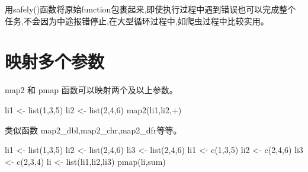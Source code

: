 \documentclass[
]{book}
\newenvironment{Shaded}{\begin{snugshade}}{\end{snugshade}}
\newcommand{\AttributeTok}[1]{\textcolor[rgb]{0.77,0.63,0.00}{#1}}
\newcommand{\DecValTok}[1]{\textcolor[rgb]{0.00,0.00,0.81}{#1}}
\newcommand{\FunctionTok}[1]{\textcolor[rgb]{0.00,0.00,0.00}{#1}}
\newcommand{\NormalTok}[1]{#1}
\newcommand{\OtherTok}[1]{\textcolor[rgb]{0.56,0.35,0.01}{#1}}
\newcommand{\StringTok}[1]{\textcolor[rgb]{0.31,0.60,0.02}{#1}}
\begin{document}
用safely()函数将原始function包裹起来,即使执行过程中遇到错误也可以完成整个任务,不会因为中途报错停止,在大型循环过程中,如爬虫过程中比较实用。

\hypertarget{ux6620ux5c04ux591aux4e2aux53c2ux6570}{%
\section{映射多个参数}\label{ux6620ux5c04ux591aux4e2aux53c2ux6570}}

map2 和 pmap 函数可以映射两个及以上参数。

\begin{Shaded}
\begin{Highlighting}[]
\NormalTok{li1 }\OtherTok{\textless{}{-}} \FunctionTok{list}\NormalTok{(}\DecValTok{1}\NormalTok{,}\DecValTok{3}\NormalTok{,}\DecValTok{5}\NormalTok{)}
\NormalTok{li2 }\OtherTok{\textless{}{-}} \FunctionTok{list}\NormalTok{(}\DecValTok{2}\NormalTok{,}\DecValTok{4}\NormalTok{,}\DecValTok{6}\NormalTok{)}
\FunctionTok{map2}\NormalTok{(li1,li2,}\StringTok{\textasciigrave{}}\AttributeTok{+}\StringTok{\textasciigrave{}}\NormalTok{)}
\end{Highlighting}
\end{Shaded}

类似函数 map2\_dbl,map2\_chr,map2\_dfr等等。

\begin{Shaded}
\begin{Highlighting}[]
\NormalTok{li1 }\OtherTok{\textless{}{-}} \FunctionTok{list}\NormalTok{(}\DecValTok{1}\NormalTok{,}\DecValTok{3}\NormalTok{,}\DecValTok{5}\NormalTok{)}
\NormalTok{li2 }\OtherTok{\textless{}{-}} \FunctionTok{list}\NormalTok{(}\DecValTok{2}\NormalTok{,}\DecValTok{4}\NormalTok{,}\DecValTok{6}\NormalTok{)}
\NormalTok{li3 }\OtherTok{\textless{}{-}} \FunctionTok{list}\NormalTok{(}\DecValTok{2}\NormalTok{,}\DecValTok{4}\NormalTok{,}\DecValTok{6}\NormalTok{)}
\NormalTok{li1 }\OtherTok{\textless{}{-}} \FunctionTok{c}\NormalTok{(}\DecValTok{1}\NormalTok{,}\DecValTok{3}\NormalTok{,}\DecValTok{5}\NormalTok{)}
\NormalTok{li2 }\OtherTok{\textless{}{-}} \FunctionTok{c}\NormalTok{(}\DecValTok{2}\NormalTok{,}\DecValTok{4}\NormalTok{,}\DecValTok{6}\NormalTok{)}
\NormalTok{li3 }\OtherTok{\textless{}{-}} \FunctionTok{c}\NormalTok{(}\DecValTok{2}\NormalTok{,}\DecValTok{3}\NormalTok{,}\DecValTok{4}\NormalTok{)}
\NormalTok{li }\OtherTok{\textless{}{-}} \FunctionTok{list}\NormalTok{(li1,li2,li3)}
\FunctionTok{pmap}\NormalTok{(li,sum)}
\end{Highlighting}
\end{Shaded}
\end{document}
